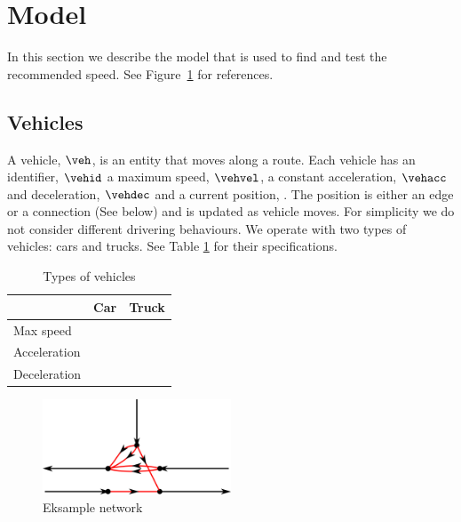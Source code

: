\section{Model}
In this section we describe the model that is used to find and test the recommended speed.
See Figure~\ref{fig:Introduction:network} for references.

\subsection{Vehicles}
A vehicle, $\veh$, is an entity that moves along a route.
Each vehicle has an identifier, $\vehid$ a maximum speed, $\vehvel$, a constant acceleration, $\vehacc$ and deceleration, $\vehdec$ and a current position, \vehpos. The position is either an edge or a connection (See below) and is updated as vehicle moves.
For simplicity we do not consider different drivering behaviours.
We operate with two types of vehicles: cars and trucks. See Table \ref{table.vehicleTypes} for their specifications.
\begin{table}
\centering
\begin{tabular}{|l|l|l|}\hline
				& Car 	& Truck \\\hline
Max speed 		& 		& \\\hline
Acceleration 	&		& \\\hline
Deceleration 	&		& \\\hline
\end{tabular}
\caption{Types of vehicles}\label{table.vehicleTypes}
\end{table}
\begin{figure}[htb]
\centering
\includegraphics[width=0.5\textwidth]{images/ConnectionNetwork.png}
\caption{Eksample network}
\label{fig:Introduction:network}
\end{figure}
